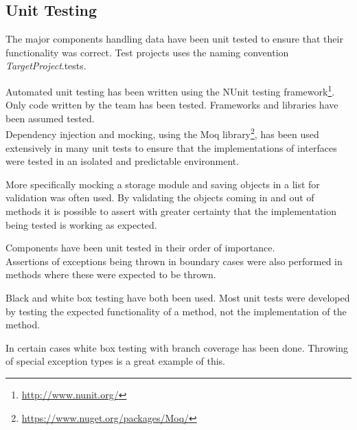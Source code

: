 \subsection{Unit Testing}
The major components handling data have been unit tested to ensure that their functionality was correct. Test projects uses the naming convention \textit{TargetProject}.tests.

Automated unit testing has been written using the NUnit testing framework\footnote{\url{http://www.nunit.org/}}. Only code written by the team has been tested. Frameworks and libraries have been assumed tested. \\

Dependency injection and mocking, using the Moq library\footnote{\url{https://www.nuget.org/packages/Moq/}}, has been used extensively in many unit tests to ensure that the implementations of interfaces were tested in an isolated and predictable environment.

More specifically mocking a storage module and saving objects in a list for validation was often used. By validating the objects coming in and out of methods it is possible to assert with greater certainty that the implementation being tested is working as expected.

Components have been unit tested in their order of importance. \\

Assertions of exceptions being thrown in boundary cases were also performed in methods where these were expected to be thrown.

Black and white box testing have both been used. Most unit tests were developed by testing the expected functionality of a method, not the implementation of the method. 

In certain cases white box testing with branch coverage has been done. Throwing of special exception types is a great example of this.